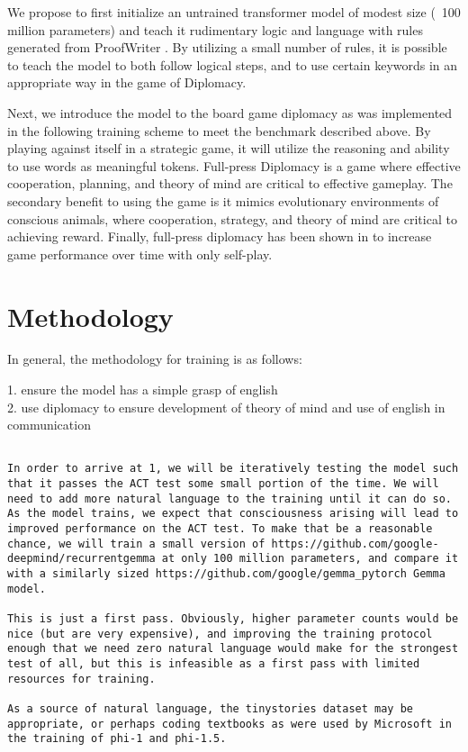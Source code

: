 \documentclass{article}
\begin{document}
We propose to first initialize an untrained transformer model of modest size (~100 million parameters) and teach it rudimentary logic and language with rules generated from ProofWriter \citep{tafjord2021proofwritergeneratingimplicationsproofs}. By utilizing a small number of rules, it is possible to teach the model to both follow logical steps, and to use certain keywords in an appropriate way in the game of Diplomacy.

Next, we introduce the model to the board game diplomacy as was implemented in \citep{fair2022diplomacy} 
the following training scheme to meet the benchmark described above. By playing against itself in a strategic game, it will utilize the reasoning and ability to use words as meaningful tokens. Full-press Diplomacy is a game where effective cooperation, planning, and theory of mind are critical to effective gameplay. The secondary benefit to using the game is it mimics evolutionary environments of conscious animals, where cooperation, strategy, and theory of mind are critical to achieving reward. Finally, full-press diplomacy has been shown in \citep{fair2022diplomacy} to increase game performance over time with only self-play.

\section{Methodology}

In general, the methodology for training is as follows:

1. ensure the model has a simple grasp of english\\

2. use diplomacy to ensure development of theory of mind and use of english in communication\\

\begin{lstlisting}[breaklines=true, breakatwhitespace=true, columns=flexible, basicstyle=\ttfamily\small]

In order to arrive at 1, we will be iteratively testing the model such that it passes the ACT test some small portion of the time. We will need to add more natural language to the training until it can do so. As the model trains, we expect that consciousness arising will lead to improved performance on the ACT test. To make that be a reasonable chance, we will train a small version of https://github.com/google-deepmind/recurrentgemma at only 100 million parameters, and compare it with a similarly sized https://github.com/google/gemma_pytorch Gemma model.

This is just a first pass. Obviously, higher parameter counts would be nice (but are very expensive), and improving the training protocol enough that we need zero natural language would make for the strongest test of all, but this is infeasible as a first pass with limited resources for training.

As a source of natural language, the tinystories dataset may be appropriate, or perhaps coding textbooks as were used by Microsoft in the training of phi-1 and phi-1.5.


\end{lstlisting}
\end{document}
